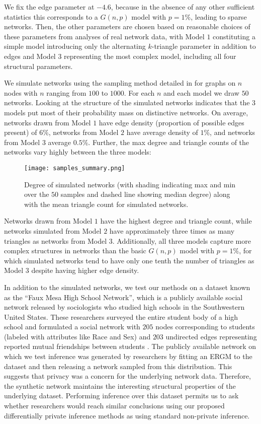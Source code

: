  	 We fix the edge parameter at $-4.6$, because in the absence of any other sufficient statistics this corresponds to a $G(n,p)$ model with $p = 1\%$, leading to sparse networks. Then, the other parameters are chosen based on reasonable choices of these parameters from analyses of real network data, with Model $1$ constituting a simple model introducing only the alternating $k$-triangle parameter in addition to edges and Model $3$ representing the most complex model, including all four structural parameters. 
 	 
 	 We simulate networks using the sampling method detailed in  for graphs on $n$ nodes with $n$ ranging from $100$ to $1000$. For each $n$ and each model we draw $50$ networks. Looking at the structure of the simulated networks indicates that the $3$ models put most of their probability mass on distinctive networks. On average, networks drawn from Model $1$  have edge density (proportion of possible edges present) of $6\%$, networks from Model $2$ have average density of $1\%$, and networks from Model $3$ average $0.5\%$.  Further, the max degree and triangle counts of the networks vary highly between the three models:
 	
 	\begin{figure}[!h]
 		\centering
 		\texttt{[image: samples\_summary.png]}
 		\caption{Degree of simulated networks (with shading indicating max and min over the $50$ samples and dashed line showing median degree) along with the mean triangle count for simulated networks.}
 	\end{figure}
 
 	 Networks drawn from Model $1$ have the highest degree and triangle count, while networks simulated from Model $2$ have approximately three times as many triangles as networks from Model $3$. Additionally, all three models capture more complex structures in networks than the basic $G(n,p)$ model with $p = 1\%$, for which simulated networks tend to have only one tenth the number of triangles as Model $3$ despite having higher edge density.  
 	
 	 In addition to the simulated networks, we test our methods on a dataset known as the ``Faux Mesa High School Network'', which is a publicly available social network released by sociologists who studied high schools in the Southwestern United States. These researchers surveyed the entire student body of a high school and formulated a social network with $205$ nodes corresponding to students (labeled with attributes like Race and Sex) and $203$ undirected edges representing reported mutual friendships between students \cite{ergm}. The publicly available network on which we test inference was generated by researchers by fitting an ERGM to the dataset and then releasing a network sampled from this distribution. This suggests that privacy was a concern for the underlying network data. Therefore, the synthetic network maintains the interesting structural properties of the underlying dataset. Performing inference over this dataset permits us to ask whether researchers would reach similar conclusions using our proposed differentially private inference methods as using standard non-private inference. 
 	 
